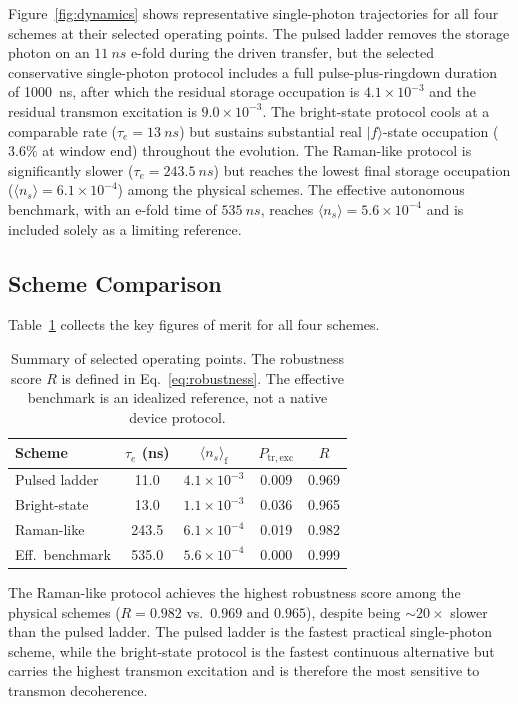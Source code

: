 \documentclass[aps,pra,twocolumn,reprint,floatfix,amsmath,amssymb]{revtex4-2}
\begin{document}
Figure~\ref{fig:dynamics} shows representative single-photon trajectories for all four schemes at their selected operating points.
The pulsed ladder removes the storage photon on an $\SI{11}{ns}$ e-fold during the driven transfer, but the selected conservative single-photon protocol includes a full pulse-plus-ringdown duration of \SI{1000}{ns}, after which the residual storage occupation is $4.1 \times 10^{-3}$ and the residual transmon excitation is $9.0 \times 10^{-3}$.
The bright-state protocol cools at a comparable rate ($\tau_e = \SI{13}{ns}$) but sustains substantial real $|f\rangle$-state occupation ($3.6\%$ at window end) throughout the evolution.
The Raman-like protocol is significantly slower ($\tau_e = \SI{243.5}{ns}$) but reaches the lowest final storage occupation ($\langle n_s \rangle = 6.1 \times 10^{-4}$) among the physical schemes.
The effective autonomous benchmark, with an e-fold time of $\SI{535}{ns}$, reaches $\langle n_s \rangle = 5.6 \times 10^{-4}$ and is included solely as a limiting reference.

\subsection{Scheme Comparison}

Table~\ref{tab:summary} collects the key figures of merit for all four schemes.

\begin{table}[t]
\caption{Summary of selected operating points. The robustness score $R$ is defined in Eq.~\eqref{eq:robustness}. The effective benchmark is an idealized reference, not a native device protocol.}
\label{tab:summary}
\begin{tabular}{lcccc}
\toprule
Scheme & $\tau_e$ (ns) & $\langle n_s\rangle_{\mathrm{f}}$ & $P_{\mathrm{tr,exc}}$ & $R$ \\
\midrule
Pulsed ladder         & 11.0  & $4.1 \times 10^{-3}$ & 0.009 & 0.969 \\
Bright-state          & 13.0  & $1.1 \times 10^{-3}$ & 0.036 & 0.965 \\
Raman-like            & 243.5 & $6.1 \times 10^{-4}$ & 0.019 & 0.982 \\
Eff.\ benchmark       & 535.0 & $5.6 \times 10^{-4}$ & 0.000 & 0.999 \\
\bottomrule
\end{tabular}
\end{table}

The Raman-like protocol achieves the highest robustness score among the physical schemes ($R = 0.982$ vs.\ $0.969$ and $0.965$), despite being ${\sim}20\times$ slower than the pulsed ladder.
The pulsed ladder is the fastest practical single-photon scheme, while the bright-state protocol is the fastest continuous alternative but carries the highest transmon excitation and is therefore the most sensitive to transmon decoherence.
\end{document}
